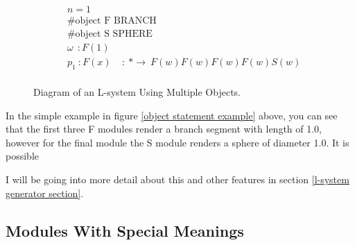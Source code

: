 \vspace{5mm}

\begin{equation} \label{object statement example}
\begin{aligned}
	&n=1 \\
	&\textrm{\#object F BRANCH}\\
	&\textrm{\#object S SPHERE}\\
	&\omega~~ : F(1)\\
	&p_1~ :  F(x)~~~~~ :~ * \rightarrow~ F(w)F(w)F(w)F(w)S(w)\\
\end{aligned}
\end{equation}

\begin{figure}[htbp]
	{\centering
		\vspace{7px}
		\setlength{\fboxrule}{1pt}
		\caption{Diagram of an L-system Using Multiple Objects.}
	}
\end{figure}
\FloatBarrier

\vspace{5mm}

In the simple example in figure \ref{object statement example} above, you can see that the first three F modules render a branch segment with length of 1.0, however for the final module the S module renders a sphere of diameter 1.0. It is possible  

I will be going into more detail about this and other features in section \ref{l-system generator section}.

\subsection{Modules With Special Meanings}

